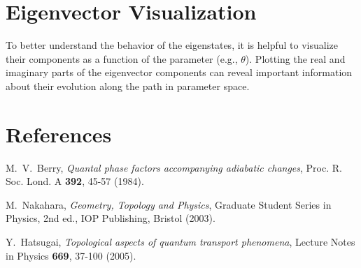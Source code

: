 \documentclass{article}
\begin{document}
\section{Eigenvector Visualization}

To better understand the behavior of the eigenstates, it is helpful to visualize their components as a function of the parameter (e.g., $\theta$). Plotting the real and imaginary parts of the eigenvector components can reveal important information about their evolution along the path in parameter space.

\section{References}

\begin{thebibliography}{9}
      M.~V.~Berry,
      \emph{Quantal phase factors accompanying adiabatic changes},
      Proc. R. Soc. Lond. A \textbf{392}, 45-57 (1984).

      M.~Nakahara,
      \emph{Geometry, Topology and Physics},
      Graduate Student Series in Physics,
      2nd ed.,
      IOP Publishing, Bristol (2003).

      Y.~Hatsugai,
      \emph{Topological aspects of quantum transport phenomena},
      Lecture Notes in Physics \textbf{669}, 37-100 (2005).
\end{thebibliography}
\end{document}
